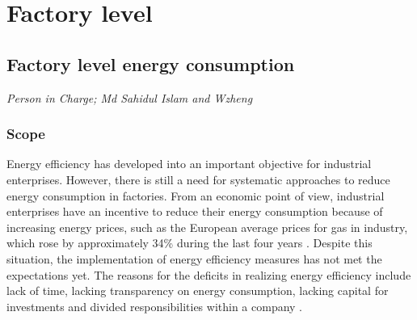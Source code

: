 \newpage
\section{Factory level}
\subsection{Factory level energy consumption}
\label{chapter 4}

\textit{Person in Charge; Md Sahidul Islam and Wzheng}

\subsubsection{Scope}
Energy efficiency has developed into an important objective for industrial enterprises. However, there is still a need for systematic approaches to reduce energy consumption in factories. From an economic point of view, industrial enterprises have an incentive to reduce their energy consumption because of increasing energy prices, such as the European average prices for gas in industry, which rose by approximately 34\% during the last four years \cite{European2013}. 
Despite this situation, the implementation of energy efficiency measures has not met the expectations yet. The reasons for the deficits in realizing energy efficiency include lack of time, lacking transparency on energy consumption, lacking capital for investments and divided responsibilities within a company \cite{Fleiter2013}. 

